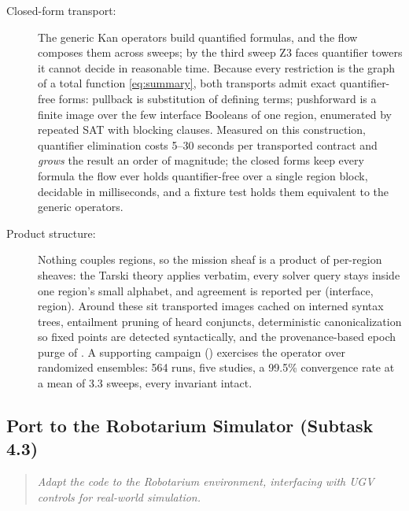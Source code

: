 \documentclass[10pt]{article}
\theoremstyle{definition}
\theoremstyle{remark}
\newcommand{\prompt}[1]{%
    \begin{quote}
        \centering\itshape #1
    \end{quote}%
}
\begin{document}
\begin{description}
    \item[Closed-form transport:] The generic Kan operators build quantified formulas, and the flow composes them across sweeps; by the third sweep Z3 faces quantifier towers it cannot decide in reasonable time. Because every restriction is the graph of a total function \eqref{eq:summary}, both transports admit exact quantifier-free forms: pullback is substitution of defining terms; pushforward is a finite image over the few interface Booleans of one region, enumerated by repeated SAT with blocking clauses. Measured on this construction, quantifier elimination costs 5--30 seconds per transported contract and \emph{grows} the result an order of magnitude; the closed forms keep every formula the flow ever holds quantifier-free over a single region block, decidable in milliseconds, and a fixture test holds them equivalent to the generic operators.
    \item[Product structure:] Nothing couples regions, so the mission sheaf is a product of per-region sheaves: the Tarski theory applies verbatim, every solver query stays inside one region's small alphabet, and agreement is reported per (interface, region). Around these sit transported images cached on interned syntax trees, entailment pruning of heard conjuncts, deterministic canonicalization so fixed points are detected syntactically, and the provenance-based epoch purge of . A supporting campaign () exercises the operator over randomized ensembles: 564 runs, five studies, a 99.5\% convergence rate at a mean of 3.3 sweeps, every invariant intact.
\end{description}

\subsection{Port to the Robotarium Simulator (Subtask 4.3)}
\label{sec:task43}

\prompt{Adapt the code to the Robotarium environment, interfacing with UGV controls for real-world simulation.}
\end{document}
